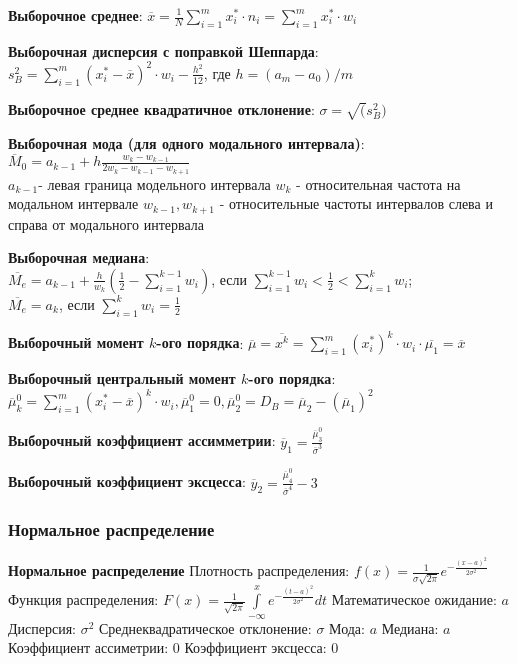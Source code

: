 \textbf{Выборочное среднее}: $\overline{x} = \frac{1}{N} \sum\limits_{i=1}^m x_{i}^* \cdot n_i = \sum\limits_{i=1}^m x_{i}^* \cdot w_i$

\textbf{Выборочная дисперсия с поправкой Шеппарда}: $s_{B}^2 = \sum\limits_{i=1}^m (x_{i}^* - \overline{x})^2 \cdot w_i - \frac{h^2}{12}$,
где $h=(a_m - a_0)/m$

\textbf{Выборочное среднее квадратичное отклонение}: $\sigma = \sqrt(s_{B}^2)$

\textbf{Выборочная мода (для одного модального интервала)}: \\
$\overline{M}_0 = a_{k-1} + h \frac{w_k - w_{k-1}}{2w_k - w_{k-1} - w_{k+1}}$\\
$a_{k-1}$- левая граница модельного интервала
$w_k$ - относительная частота на модальном интервале
$w_{k-1}, w_{k+1}$ - относительные частоты интервалов слева и справа от модального интервала

\textbf{Выборочная медиана}:\\
$\overline{M_e} = a_{k-1} + \frac{h}{w_k} (\frac{1}{2} - \sum\limits_{i=1}^{k-1} w_i)$, если $\sum\limits_{i=1}^{k-1}w_i < \frac{1}{2} < \sum\limits_{i=1}^{k}w_i$;\\
$\overline{M_e} = a_k$, если $\sum\limits_{i=1}^k w_i =\frac{1}{2}$

\textbf{Выборочный момент $k$-ого порядка}: $\overline{\mu} = \overline{x^k} = \sum\limits_{i=1}^m (x_{i}^*)^k \cdot w_i \cdot \overline{\mu_1} = \overline{x}$

\textbf{Выборочный центральный момент $k$-ого порядка}: $\overline{\mu}_{k}^0 = \sum\limits_{i=1}^m (x_{i}^* - \overline{x})^k \cdot w_i, \overline{\mu}_{1}^0 = 0, \overline{\mu}_{2}^0 = D_B = \overline{\mu}_{2} - (\overline{\mu}_1)^2$

\textbf{Выборочный коэффициент ассимметрии}: $\overline{y}_1 = \frac{\overline{\mu}_{3}^0}{\overline{\sigma}^3}$

\textbf{Выборочный коэффициент эксцесса}: $\overline{y}_2 = \frac{\overline{\mu}_{4}^0}{\overline{\sigma}^4} -3$ 


\subsubsection{Нормальное распределение}
\textbf{Нормальное распределение} Плотность распределения: $f(x) = \frac{1}{\sigma \sqrt{2\pi}} e^{-\frac{(x-a)^2}{2\sigma^2}}$
Функция распределения: $F(x) = \frac{1}{\sqrt{2\pi}} \int\limits_{-\infty}^x e^{-\frac{(t-a)^2}{2\sigma^2}} dt$
Математическое ожидание: $a$
Дисперсия: $\sigma^2$
Среднеквадратическое отклонение: $\sigma$
Мода: $a$
Медиана: $a$
Коэффициент ассиметрии: $0$
Коэффициент эксцесса: $0$

